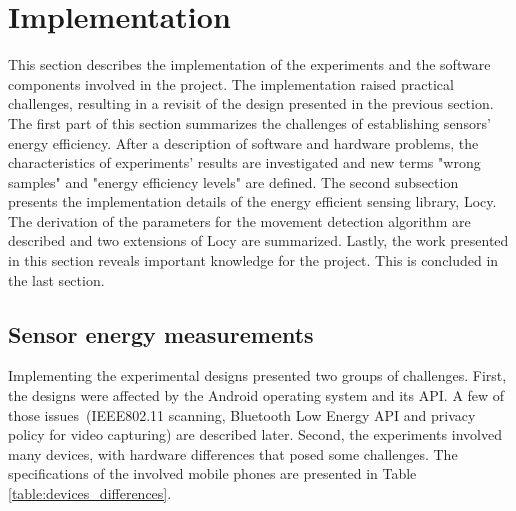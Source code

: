 \section{Implementation}
\label{s:implementation}
\hspace{10pt} This section describes the implementation of the experiments and the software components involved in the project. The implementation raised practical challenges, resulting in a revisit of the design presented in the previous section. The first part of this section summarizes the challenges of establishing sensors' energy efficiency. After a description of software and hardware problems, the characteristics of experiments' results are investigated and new terms "wrong samples" and "energy efficiency levels" are defined. The second subsection presents the implementation details of the energy efficient sensing library, Locy. The derivation of the parameters for the movement detection algorithm are described and two extensions of Locy are summarized. Lastly, the work presented in this section reveals important knowledge for the project. This is concluded in the last section.

\subsection{Sensor energy measurements}
\hspace{10pt} Implementing the experimental designs presented two groups of challenges. First, the designs were affected by the Android operating system and its API. A few of those issues\ (IEEE802.11 scanning, Bluetooth Low Energy API and privacy policy for video capturing) are described later. Second, the experiments involved many devices, with hardware differences that posed some challenges. The specifications of the involved mobile phones are presented in Table \ref{table:devices_differences}.
	
